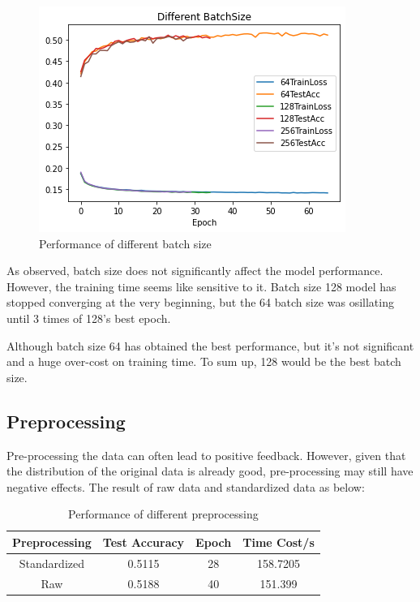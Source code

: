 \documentclass{article}[12pt]
\begin{document}
\begin{figure}[H]
    \centering
    \includegraphics[scale=0.5]{Figures/2.BatchSize/download}
    \caption{Performance of different batch size}
\end{figure}

    As observed, batch size does not significantly affect the model performance. However,
    the training time seems like sensitive to it. Batch size 128 model has stopped converging
    at the very beginning, but the 64 batch size was osillating until 3 times of 128's best epoch.

    Although batch size 64 has obtained the best performance, but it's not significant
    and a huge over-cost on training time. To sum up, 128 would be the best batch size.

\subsection{Preprocessing}
    Pre-processing the data can often lead to positive feedback.
    However, given that the distribution of the original data is already good,
    pre-processing may still have negative effects.
    The result of raw data and standardized data as below:

\begin{table}[H]\label{tab:table}
    \centering
    \begin{tabular}{|c|c|c|c|}
        \hline
        Preprocessing & Test Accuracy & Epoch & Time Cost/s\\\hline
        Standardized & 0.5115 & 28 & 158.7205\\\hline
        Raw & 0.5188 & 40 & 151.399\\\hline
    \end{tabular}
    \caption{Performance of different preprocessing}
\end{table}
\end{document}
